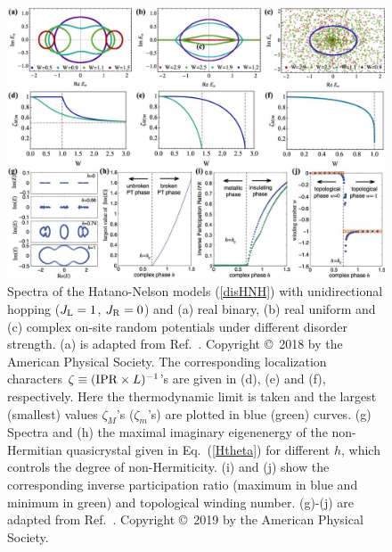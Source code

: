 \documentclass{tADP2e}
\theoremstyle{plain}
\theoremstyle{plain}
\theoremstyle{definition}
\begin{document}
\begin{figure}[!t]
\begin{center}
\includegraphics[width=14.5cm]{./Figures/fig_6_IPR.pdf}
\end{center}
\caption{Spectra of the Hatano-Nelson models (\ref{disHNH}) with unidirectional hopping ($J_{\rm L}=1$, $J_{\rm R}=0$) and (a) real binary, (b) real uniform and (c) complex on-site random potentials under different disorder strength. (a) is adapted from Ref.~\cite{ZG18}. Copyright \copyright\, 2018 by the American Physical Society. The corresponding localization characters $\zeta\equiv ({\rm IPR}\times L)^{-1}$'s are given in (d), (e) and (f), respectively. Here the thermodynamic limit is taken and the largest (smallest) values $\zeta_M$'s ($\zeta_m$'s) are plotted in blue (green) curves. (g) Spectra and (h) the maximal imaginary eigenenergy of the non-Hermitian quasicrystal given in Eq.~(\ref{Htheta}) for different $h$, which controls the degree of non-Hermiticity. (i) and (j) show the corresponding inverse participation ratio (maximum in blue and minimum in green) and topological winding number. (g)-(j) are adapted from Ref.~\cite{LS19}. Copyright \copyright\, 2019 by the American Physical Society.}
\label{fig:IPR}
\end{figure}
\end{document}
